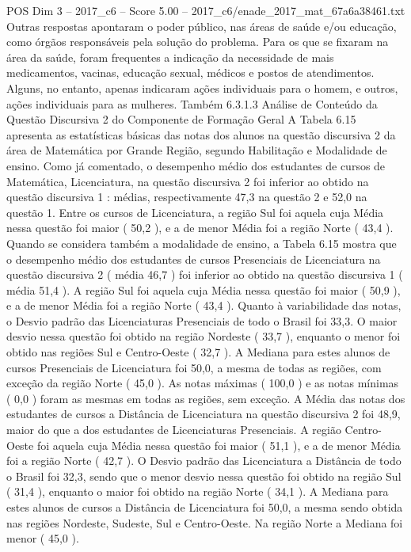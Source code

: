 \begin{textsample}{POS Dim 3 – 2017\_c6 – Score 5.00 – 2017\_c6/enade\_2017\_mat\_67a6a38461.txt}
Outras respostas apontaram o poder público, nas áreas de saúde e/ou educação, como órgãos responsáveis pela solução do problema.
Para os que se fixaram na área da saúde, foram frequentes a indicação da necessidade de mais medicamentos, vacinas, educação sexual, médicos e postos de atendimentos.
Alguns, no entanto, apenas indicaram ações individuais para o homem, e outros, ações individuais para as mulheres.
Também 6.3.1.3 Análise de Conteúdo da Questão Discursiva 2 do Componente de Formação Geral A Tabela 6.15 apresenta as estatísticas básicas das notas dos alunos na questão discursiva 2 da área de Matemática por Grande Região, segundo Habilitação e Modalidade de ensino.
Como já comentado, o desempenho médio dos estudantes de cursos de Matemática, Licenciatura, na questão discursiva 2 foi inferior ao obtido na questão discursiva 1 : médias, respectivamente 47,3 na questão 2 e 52,0 na questão 1.
Entre os cursos de Licenciatura, a região Sul foi aquela cuja Média nessa questão foi maior ( 50,2 ), e a de menor Média foi a região Norte ( 43,4 ).
Quando se considera também a modalidade de ensino, a Tabela 6.15 mostra que o desempenho médio dos estudantes de cursos Presenciais de Licenciatura na questão discursiva 2 ( média 46,7 ) foi inferior ao obtido na questão discursiva 1 ( média 51,4 ).
A região Sul foi aquela cuja Média nessa questão foi maior ( 50,9 ), e a de menor Média foi a região Norte ( 43,4 ).
Quanto à variabilidade das notas, o Desvio padrão das Licenciaturas Presenciais de todo o Brasil foi 33,3.
O maior desvio nessa questão foi obtido na região Nordeste ( 33,7 ), enquanto o menor foi obtido nas regiões Sul e Centro-Oeste ( 32,7 ).
A Mediana para estes alunos de cursos Presenciais de Licenciatura foi 50,0, a mesma de todas as regiões, com exceção da região Norte ( 45,0 ).
As notas máximas ( 100,0 ) e as notas mínimas ( 0,0 ) foram as mesmas em todas as regiões, sem exceção.
A Média das notas dos estudantes de cursos a Distância de Licenciatura na questão discursiva 2 foi 48,9, maior do que a dos estudantes de Licenciaturas Presenciais.
A região Centro-Oeste foi aquela cuja Média nessa questão foi maior ( 51,1 ), e a de menor Média foi a região Norte ( 42,7 ).
O Desvio padrão das Licenciatura a Distância de todo o Brasil foi 32,3, sendo que o menor desvio nessa questão foi obtido na região Sul ( 31,4 ), enquanto o maior foi obtido na região Norte ( 34,1 ).
A Mediana para estes alunos de cursos a Distância de Licenciatura foi 50,0, a mesma sendo obtida nas regiões Nordeste, Sudeste, Sul e Centro-Oeste.
Na região Norte a Mediana foi menor ( 45,0 ).

\end{textsample}
